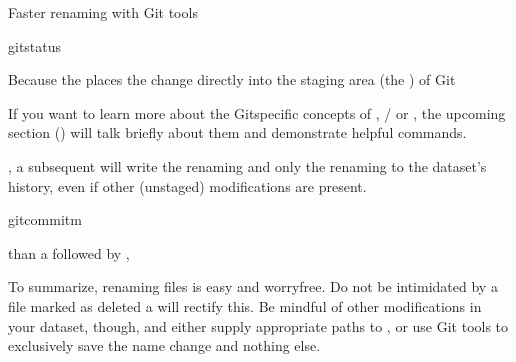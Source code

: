 \begin{findoutmore}[label={fom-gitmv}, before title={\thetcbcounter\ }, check odd page=true]{Faster renaming with Git tools}
\begin{sphinxVerbatim}[commandchars=\\\{\}]
gitstatus
\end{sphinxVerbatim}

\sphinxAtStartPar
Because the  places the change directly into the
staging area (the ) of Git%
\begin{footnote}\sphinxAtStartFootnote
If you want to learn more about the Git\sphinxhyphen{}specific concepts of ,
/ or , the upcoming section {\hyperref[\detokenize{basics/101-137-history:history}]{}} () will
talk briefly about them and demonstrate helpful commands.
%
\end{footnote},
a subsequent  will write the renaming
\textendash{} and only the renaming \textendash{} to the dataset’s history, even if other
(unstaged) modifications are present.

\begin{sphinxVerbatim}[commandchars=\\\{\}]
gitcommit\PYGZhy{}m
\end{sphinxVerbatim}

\sphinxAtStartPar
{} than a  followed by ,


\end{findoutmore}

\sphinxAtStartPar
To summarize, renaming files is easy and worry\sphinxhyphen{}free. Do not be intimidated
by a file marked as deleted \textendash{} a  will rectify this.
Be mindful of other modifications in your dataset, though, and either supply
appropriate paths to , or use Git tools to exclusively save
the name change and nothing else.

